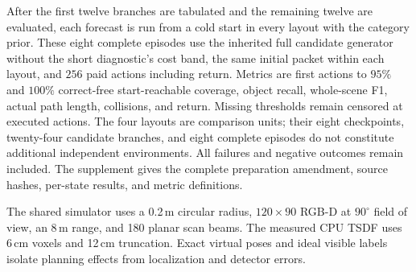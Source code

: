 After the first twelve branches are tabulated and the remaining twelve are evaluated, each forecast is run from a cold start in every layout with the category prior. These eight complete episodes use the inherited full candidate generator without the short diagnostic's cost band, the same initial packet within each layout, and $256$ paid actions including return. Metrics are first actions to $95\%$ and $100\%$ correct-free start-reachable coverage, object recall, whole-scene F1, actual path length, collisions, and return. Missing thresholds remain censored at executed actions. The four layouts are comparison units; their eight checkpoints, twenty-four candidate branches, and eight complete episodes do not constitute additional independent environments. All failures and negative outcomes remain included. The supplement gives the complete preparation amendment, source hashes, per-state results, and metric definitions.

The shared simulator uses a 0.2\,m circular radius, $120\times90$ RGB-D at $90^{\circ}$ field of view, an 8\,m range, and 180 planar scan beams. The measured CPU TSDF uses 6\,cm voxels and 12\,cm truncation. Exact virtual poses and ideal visible labels isolate planning effects from localization and detector errors.
